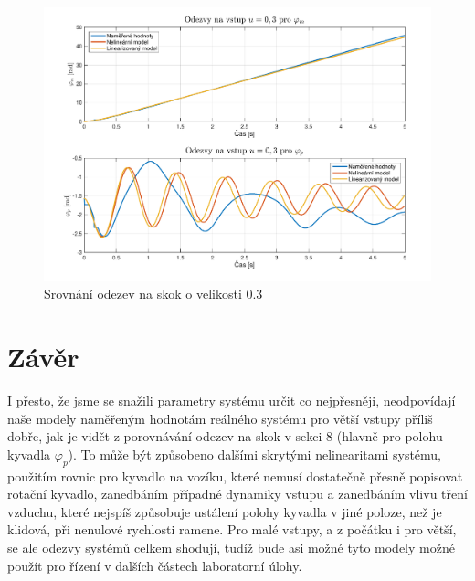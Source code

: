 \documentclass[11pt,a4paper]{article}
\begin{document}
\begin{figure}[H]
\centering
\includegraphics[scale=0.6]{Odezvy03.pdf}
\caption{Srovnání odezev na skok o velikosti 0.3}
\end{figure}


\section{Závěr}
I přesto, že jsme se snažili parametry systému určit co nejpřesněji, neodpovídají naše modely naměřeným hodnotám reálného systému pro větší vstupy příliš dobře, jak je vidět z porovnávání odezev na skok v sekci 8 (hlavně pro polohu kyvadla $\varphi_p$). To může být způsobeno dalšími skrytými nelinearitami systému, použitím rovnic pro kyvadlo na vozíku, které nemusí dostatečně přesně popisovat rotační kyvadlo, zanedbáním případné dynamiky vstupu a zanedbáním vlivu tření vzduchu, které nejspíš způsobuje ustálení polohy kyvadla v jiné poloze, než je klidová, při nenulové rychlosti ramene.
\newline
Pro malé vstupy, a z počátku i pro větší, se ale odezvy systémů celkem shodují, tudíž bude asi možné tyto modely možné použít pro řízení v dalších částech laboratorní úlohy.
\end{document}
